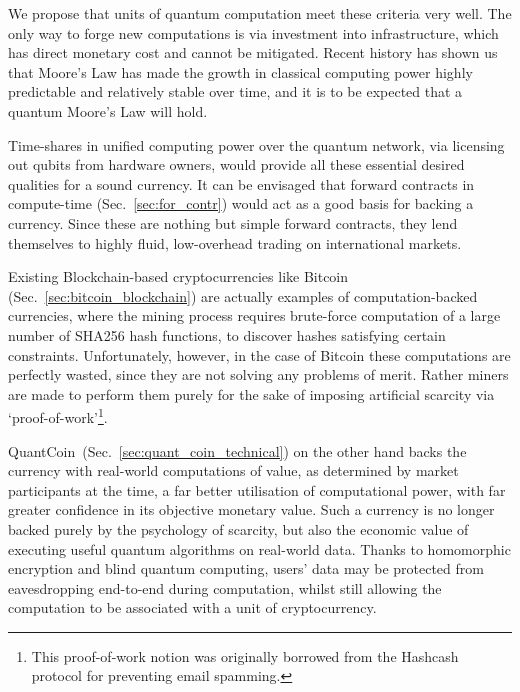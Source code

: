 We propose that units of quantum computation meet these criteria very well. The only way to forge new computations is via investment into infrastructure, which has direct monetary cost and cannot be mitigated. Recent history has shown us that Moore's Law has made the growth in classical computing power highly predictable and relatively stable over time, and it is to be expected that a quantum Moore's Law will hold.

Time-shares in unified computing power over the quantum network, via licensing out qubits from hardware owners, would provide all these essential desired qualities for a sound currency. It can be envisaged that forward contracts in compute-time (Sec.~\ref{sec:for_contr}) would act as a good basis for backing a currency. Since these are nothing but simple forward contracts, they lend themselves to highly fluid, low-overhead trading on international markets.

Existing Blockchain-based cryptocurrencies like Bitcoin (Sec.~\ref{sec:bitcoin_blockchain}) are actually examples of computation-backed currencies, where the mining process requires brute-force computation of a large number of SHA256 hash functions, to discover hashes satisfying certain constraints. Unfortunately, however, in the case of Bitcoin these computations are perfectly wasted, since they are not solving any problems of merit. Rather miners are made to perform them purely for the sake of imposing artificial scarcity via `proof-of-work'\footnote{This proof-of-work notion was originally borrowed from the Hashcash protocol for preventing email spamming.}.

QuantCoin\texttrademark\, (Sec.~\ref{sec:quant_coin_technical}) on the other hand backs the currency with real-world computations of value, as determined by market participants at the time, a far better utilisation of computational power, with far greater confidence in its objective monetary value. Such a currency is no longer backed purely by the psychology of scarcity, but also the economic value of executing useful quantum algorithms on real-world data. Thanks to homomorphic encryption and blind quantum computing, users' data may be protected from eavesdropping end-to-end during computation, whilst still allowing the computation to be associated with a unit of cryptocurrency.

